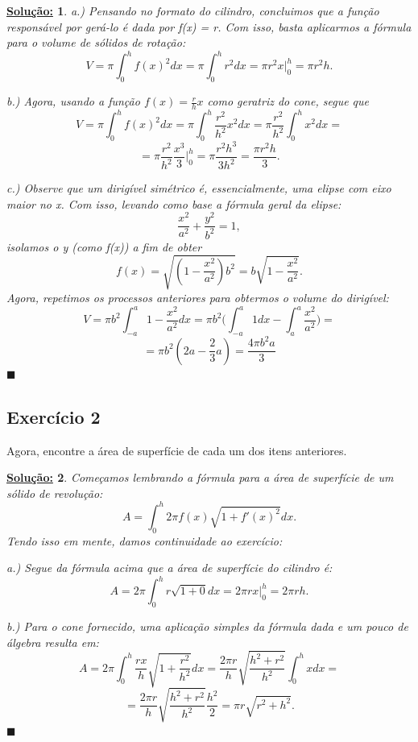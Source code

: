 \documentclass{article}
\newtheorem*{sol*}{\underline{Solu\c c\~ao:}}
\renewcommand\qedsymbol{$\blacksquare$}
\begin{document}
\begin{sol*}

	a.) Pensando no formato do cilindro, concluimos que a fun\c c\~ao respons\'avel por ger\'a-lo \'e dada
	por f(x) = r. Com isso, basta aplicarmos a f\'ormula para o volume de s\'olidos de rota\c c\~ao:
	$$
		V = \pi\int_{0}^{h}f(x)^2dx = \pi\int_{0}^{h}r^2dx = \pi{r^2}x\biggr\rvert_{0}^{h} = \pi{r^2}h.
	$$

	b.) Agora, usando a fun\c c\~ao $f(x) = \frac{r}{h}x$ como geratriz do cone, segue que
	$$
		V = \pi\int_{0}^{h}f(x)^2dx = \pi\int_{0}^{h}\frac{r^2}{h^2}x^2dx = \pi\frac{r^2}{h^2}\int_0^h x^2dx =
	$$
	$$
		= \pi\frac{r^2}{h^2}\frac{x^3}{3}\biggr\rvert_{0}^{h} = \pi\frac{r^2h^3}{3h^2} = \frac{\pi{r^2}h}{3}.
	$$

	c.) Observe que um dirig\'ivel sim\'etrico \'e, essencialmente, uma elipse com eixo maior no x. Com isso,
	levando como base a f\'ormula geral da elipse:
	$$
		\frac{x^2}{a^2} + \frac{y^2}{b^2} = 1,
	$$
	isolamos o y (como f(x)) a fim de obter
	$$
		f(x) = \sqrt{(1-\frac{x^2}{a^2})b^2} = b\sqrt{1-\frac{x^2}{a^2}}.
	$$
	Agora, repetimos os processos anteriores para obtermos o volume do dirig\'ivel:
	$$
		V = \pi{b^2}\int_{-a}^{a} 1-\frac{x^2}{a^2}dx = \pi{b^2}\biggl(\int_{-a}^{a}1 dx - \int_{a}^{a}\frac{x^2}{a^2}\biggr) =
	$$
	$$
		= \pi{b^2}(2a - \frac{2}{3}a) = \frac{4\pi{b^2}a}{3}
	$$
	\qedsymbol
\end{sol*}
\subsection{Exerc\'icio 2}
Agora, encontre a \'area de superf\'icie de cada um dos itens anteriores.

\begin{sol*}
	Come\c camos lembrando a f\'ormula para a \'area de superf\'icie de um s\'olido de revolu\c c\~ao:
	$$
		A = \int_{0}^{h}2\pi f(x)\sqrt{1 + f'(x)^2}dx.
	$$
	Tendo isso em mente, damos continuidade ao exerc\'icio:

	a.) Segue da f\'ormula acima que a \'area de superf\'icie do cilindro \'e:
	$$
		A = 2\pi \int_{0}^{h} r\sqrt{1 + 0}dx = 2\pi rx\biggr\rvert_{0}^{h} = 2\pi rh.
	$$

	b.) Para o cone fornecido, uma aplica\c c\~ao simples da f\'ormula dada e um pouco de \'algebra resulta em:
	$$
		A = 2\pi \int_{0}^{h} \frac{rx}{h}\sqrt{1 + \frac{r^2}{h^2}}dx =
		\frac{2\pi{r}}{h}\sqrt{\frac{h^2 + r^2}{h^2}}\int_{0}^{h}xdx =
	$$
	$$
		= \frac{2\pi{r}}{h}\sqrt{\frac{h^2 + r^2}{h^2}} \frac{h^2}{2} = \pi{r}\sqrt{r^2 + h^2}.
	$$
	\qedsymbol
\end{sol*}
\end{document}
